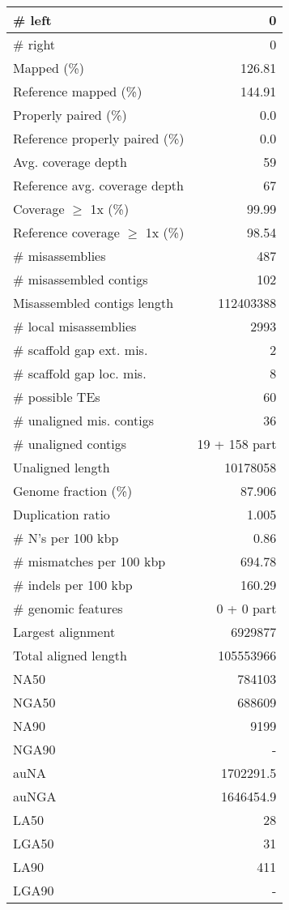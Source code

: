 \documentclass[12pt,a4paper]{article}
\begin{document}
\begin{table}[ht]
\begin{center}
\begin{tabular}{|l*{1}{|r}|}
\# left & 0 \\ \hline
\# right & 0 \\ \hline
Mapped (\%) & 126.81 \\ \hline
Reference mapped (\%) & 144.91 \\ \hline
Properly paired (\%) & 0.0 \\ \hline
Reference properly paired (\%) & 0.0 \\ \hline
Avg. coverage depth & 59 \\ \hline
Reference avg. coverage depth & 67 \\ \hline
Coverage $\geq$ 1x (\%) & 99.99 \\ \hline
Reference coverage $\geq$ 1x (\%) & 98.54 \\ \hline
\# misassemblies & 487 \\ \hline
\# misassembled contigs & 102 \\ \hline
Misassembled contigs length & 112403388 \\ \hline
\# local misassemblies & 2993 \\ \hline
\# scaffold gap ext. mis. & 2 \\ \hline
\# scaffold gap loc. mis. & 8 \\ \hline
\# possible TEs & 60 \\ \hline
\# unaligned mis. contigs & 36 \\ \hline
\# unaligned contigs & 19 + 158 part \\ \hline
Unaligned length & 10178058 \\ \hline
Genome fraction (\%) & 87.906 \\ \hline
Duplication ratio & 1.005 \\ \hline
\# N's per 100 kbp & 0.86 \\ \hline
\# mismatches per 100 kbp & 694.78 \\ \hline
\# indels per 100 kbp & 160.29 \\ \hline
\# genomic features & 0 + 0 part \\ \hline
Largest alignment & 6929877 \\ \hline
Total aligned length & 105553966 \\ \hline
NA50 & 784103 \\ \hline
NGA50 & 688609 \\ \hline
NA90 & 9199 \\ \hline
NGA90 & - \\ \hline
auNA & 1702291.5 \\ \hline
auNGA & 1646454.9 \\ \hline
LA50 & 28 \\ \hline
LGA50 & 31 \\ \hline
LA90 & 411 \\ \hline
LGA90 & - \\ \hline
\end{tabular}
\end{center}
\end{table}
\end{document}
